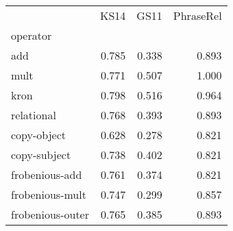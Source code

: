 \begin{tabular}{lrrr}
\toprule
{} &   KS14 &   GS11 &  PhraseRel \\
operator         &        &        &            \\
\midrule
add              &  0.785 &  0.338 &      0.893 \\
mult             &  0.771 &  0.507 &      1.000 \\
kron             &  0.798 &  0.516 &      0.964 \\
relational       &  0.768 &  0.393 &      0.893 \\
copy-object      &  0.628 &  0.278 &      0.821 \\
copy-subject     &  0.738 &  0.402 &      0.821 \\
frobenious-add   &  0.761 &  0.374 &      0.821 \\
frobenious-mult  &  0.747 &  0.299 &      0.857 \\
frobenious-outer &  0.765 &  0.385 &      0.893 \\
\bottomrule
\end{tabular}
